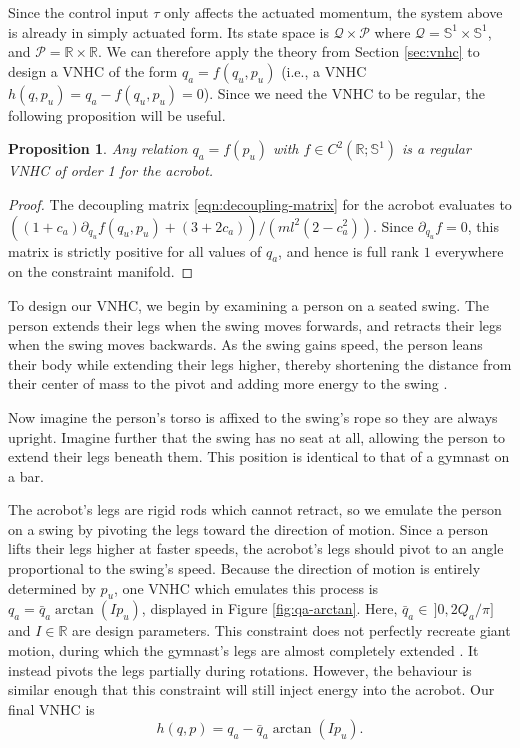 \documentclass[journal,twoside,web, onecolumn, draftcls]{ieeecolor}
\newtheorem{prop}{Proposition} %
\newcommand*{\R}{\mathbb{R}}
\newcommand*{\Sone}{\mathbb{S}^1}
\begin{document}
Since the control input \(\tau\) only affects the actuated momentum,
the system above is already in simply actuated form.
Its state space is \(\mathcal{Q} \times \mathcal{P}\) where
\(\mathcal{Q} = \Sone \times \Sone\), and
\(\mathcal{P} = \R \times \R\).
We can therefore apply the theory from Section \ref{sec:vnhc} to design
a VNHC of the form \(q_a = f(q_u,p_u)\) (i.e., a VNHC 
\(h(q,p_u) = q_a - f(q_u,p_u) = 0\)).
Since we need the VNHC to be regular, the following proposition will be
useful.
\begin{prop}\label{prop:acrobot-fpu-regular}
    Any relation \(q_a = f(p_u)\) 
    with \(f \in C^2\left(\R; \Sone\right)\) is a regular
    VNHC of order 1 for the acrobot.
\end{prop}
\begin{proof}
    The decoupling matrix \eqref{eqn:decoupling-matrix} for the acrobot
    evaluates to
    \(((1+c_a)\partial_{q_u}f(q_u,p_u) + (3+2c_a))/(ml^2(2-c_a^2))\).
    Since \(\partial_{q_u} f = 0\), this matrix is strictly positive for all values
    of \(q_a\), and hence is full rank \(1\) everywhere on the constraint manifold.
\end{proof}

To design our VNHC, we begin by examining a person on a
seated swing.
The person extends their legs when the swing moves forwards, and retracts their
legs when the swing moves backwards.
As the swing gains speed, the person leans their body while
extending their legs higher, thereby shortening the distance
from their center of mass to the pivot and adding more energy to the swing
\cite{how_to_pump_a_swing}.

Now imagine the person's torso is affixed to the swing's rope so they are
always upright. 
Imagine further that the swing has no seat at all, allowing the person to extend
their legs beneath them. 
This position is identical to that of a gymnast on a bar.

The acrobot's legs are rigid rods which cannot retract, so we emulate the person
on a swing by pivoting the legs toward the direction of motion. 
Since a person lifts their legs higher at faster speeds, the acrobot's legs should
pivot to an angle proportional to the swing's speed.
Because the direction of motion is entirely determined by \(p_u\), 
one VNHC which emulates this process is \(q_a = \bar{q}_a\arctan( I p_u)\),
displayed in Figure \ref{fig:qa-arctan}.
Here, \(\bar{q}_a \in \, ]0,2 Q_a/\pi]\) and \(I \in \R\) are 
design parameters.
This constraint does not perfectly recreate giant motion, during which
the gymnast's legs are almost completely extended \cite{usagym_giant}.
It instead pivots the legs partially during rotations.
However, the behaviour is similar enough that this constraint will
still inject energy into the acrobot.
Our final VNHC is
\begin{equation}\label{eqn:acrobot-constraint}
    h(q,p) = q_a - \bar{q}_a \arctan(I p_u)
    .
\end{equation}
\end{document}
